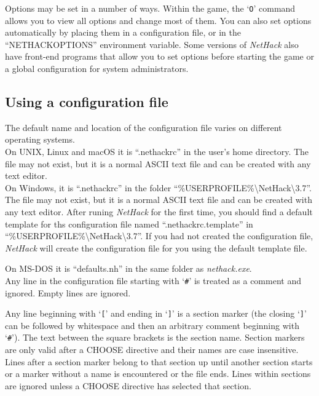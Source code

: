 Options may be set in a number of ways.  Within the game, the `{\tt O}'
command allows you to view all options and change most of them.
You can also set options automatically by placing them in a configuration
file, or in the ``NETHACKOPTIONS'' environment variable.
Some versions of {\it NetHack\/} also have front-end programs that allow
you to set options before starting the game or a global configuration
for system administrators.

\subsection*{Using a configuration file}

The default name and location of the configuration file varies on different
operating systems.\\

On UNIX, Linux and macOS it is \mbox{``.nethackrc''} in the user's home
directory. The file may not exist, but it is a normal ASCII text file and
can be created with any text editor.\\

On Windows, it is \mbox{``.nethackrc''} in the folder
\mbox{{``\%USERPROFILE\%\textbackslash NetHack\textbackslash 3.7''}}. The
file may not exist, but it is a normal ASCII text file and can be created
with any text editor.
After runing {\it NetHack\/} for the first time, you should find a default
template for ths configuration file named \mbox{``.nethackrc.template''} in
\mbox{{``\%USERPROFILE\%\textbackslash NetHack\textbackslash 3.7''}}.
If you had not created the configuration file, {\it NetHack\/} will create
the configuration file for you using the default template file.

On MS-DOS it is \mbox{``defaults.nh''} in the same folder as
\mbox{{\it nethack.exe\/}}.\\

Any line in the configuration file starting with `{\tt \#}' is treated
as a comment and ignored.
Empty lines are ignored.

Any line beginning with `{\tt \verb+[+}' and ending in `{\tt \verb+]+}'
is a section marker (the closing `{\tt \verb+]+}' can be followed
by whitespace and then an arbitrary comment beginning with `{\tt \#}').
The text between the square brackets is the section name.
Section markers are only valid after a CHOOSE directive and their names
are case insensitive.
Lines after a section marker belong to that section up until another
section starts or a marker without a name is encountered or the file ends.
Lines within sections are ignored unless a CHOOSE directive has selected
that section.

